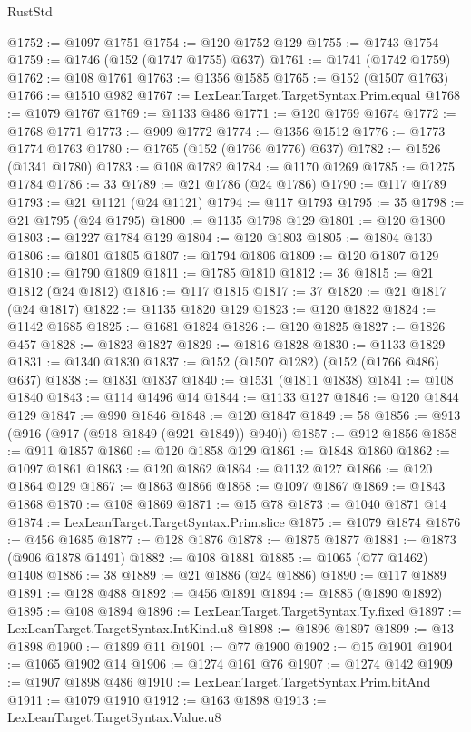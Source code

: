 \begin{lexlean}{RustStd}
\begin{coremodule}
@1752 := @1097 @1751
@1754 := @120 @1752 @129
@1755 := @1743 @1754
@1759 := @1746 (@152 (@1747 @1755) @637)
@1761 := @1741 (@1742 @1759)
@1762 := @108 @1761
@1763 := @1356 @1585
@1765 := @152 (@1507 @1763)
@1766 := @1510 @982
@1767 := LexLeanTarget.TargetSyntax.Prim.equal
@1768 := @1079 @1767
@1769 := @1133 @486
@1771 := @120 @1769 @1674
@1772 := @1768 @1771
@1773 := @909 @1772
@1774 := @1356 @1512
@1776 := @1773 @1774 @1763
@1780 := @1765 (@152 (@1766 @1776) @637)
@1782 := @1526 (@1341 @1780)
@1783 := @108 @1782
@1784 := @1170 @1269
@1785 := @1275 @1784
@1786 := 33
@1789 := @21 @1786 (@24 @1786)
@1790 := @117 @1789
@1793 := @21 @1121 (@24 @1121)
@1794 := @117 @1793
@1795 := 35
@1798 := @21 @1795 (@24 @1795)
@1800 := @1135 @1798 @129
@1801 := @120 @1800
@1803 := @1227 @1784 @129
@1804 := @120 @1803
@1805 := @1804 @130
@1806 := @1801 @1805
@1807 := @1794 @1806
@1809 := @120 @1807 @129
@1810 := @1790 @1809
@1811 := @1785 @1810
@1812 := 36
@1815 := @21 @1812 (@24 @1812)
@1816 := @117 @1815
@1817 := 37
@1820 := @21 @1817 (@24 @1817)
@1822 := @1135 @1820 @129
@1823 := @120 @1822
@1824 := @1142 @1685
@1825 := @1681 @1824
@1826 := @120 @1825
@1827 := @1826 @457
@1828 := @1823 @1827
@1829 := @1816 @1828
@1830 := @1133 @1829
@1831 := @1340 @1830
@1837 := @152 (@1507 @1282) (@152 (@1766 @486) @637)
@1838 := @1831 @1837
@1840 := @1531 (@1811 @1838)
@1841 := @108 @1840
@1843 := @114 @1496 @14
@1844 := @1133 @127
@1846 := @120 @1844 @129
@1847 := @990 @1846
@1848 := @120 @1847
@1849 := 58
@1856 := @913 (@916 (@917 (@918 @1849 (@921 @1849)) @940))
@1857 := @912 @1856
@1858 := @911 @1857
@1860 := @120 @1858 @129
@1861 := @1848 @1860
@1862 := @1097 @1861
@1863 := @120 @1862
@1864 := @1132 @127
@1866 := @120 @1864 @129
@1867 := @1863 @1866
@1868 := @1097 @1867
@1869 := @1843 @1868
@1870 := @108 @1869
@1871 := @15 @78
@1873 := @1040 @1871 @14
@1874 := LexLeanTarget.TargetSyntax.Prim.slice
@1875 := @1079 @1874
@1876 := @456 @1685
@1877 := @128 @1876
@1878 := @1875 @1877
@1881 := @1873 (@906 @1878 @1491)
@1882 := @108 @1881
@1885 := @1065 (@77 @1462) @1408
@1886 := 38
@1889 := @21 @1886 (@24 @1886)
@1890 := @117 @1889
@1891 := @128 @488
@1892 := @456 @1891
@1894 := @1885 (@1890 @1892)
@1895 := @108 @1894
@1896 := LexLeanTarget.TargetSyntax.Ty.fixed
@1897 := LexLeanTarget.TargetSyntax.IntKind.u8
@1898 := @1896 @1897
@1899 := @13 @1898
@1900 := @1899 @11
@1901 := @77 @1900
@1902 := @15 @1901
@1904 := @1065 @1902 @14
@1906 := @1274 @161 @76
@1907 := @1274 @142
@1909 := @1907 @1898 @486
@1910 := LexLeanTarget.TargetSyntax.Prim.bitAnd
@1911 := @1079 @1910
@1912 := @163 @1898
@1913 := LexLeanTarget.TargetSyntax.Value.u8

\end{coremodule}
\end{lexlean}
